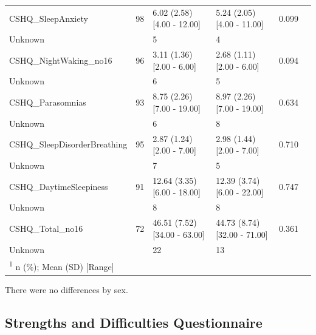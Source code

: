 \documentclass[
]{article}
\begin{document}
\begin{table}[!h]
\begin{tabular}[t]{llllll}
\addlinespace
CSHQ\_SleepAnxiety & 98 & 6.02 (2.58)   [4.00 - 12.00] & 5.24 (2.05)   [4.00 - 11.00] & 0.099 & \\
\hspace{1em}Unknown &  & 5 & 4 &  & \\
CSHQ\_NightWaking\_no16 & 96 & 3.11 (1.36)   [2.00 - 6.00] & 2.68 (1.11)   [2.00 - 6.00] & 0.094 & \\
\hspace{1em}Unknown &  & 6 & 5 &  & \\
CSHQ\_Parasomnias & 93 & 8.75 (2.26)   [7.00 - 19.00] & 8.97 (2.26)   [7.00 - 19.00] & 0.634 & \\
\addlinespace
\hspace{1em}Unknown &  & 6 & 8 &  & \\
CSHQ\_SleepDisorderBreathing & 95 & 2.87 (1.24)   [2.00 - 7.00] & 2.98 (1.44)   [2.00 - 7.00] & 0.710 & \\
\hspace{1em}Unknown &  & 7 & 5 &  & \\
CSHQ\_DaytimeSleepiness & 91 & 12.64 (3.35)   [6.00 - 18.00] & 12.39 (3.74)   [6.00 - 22.00] & 0.747 & \\
\hspace{1em}Unknown &  & 8 & 8 &  & \\
\addlinespace
CSHQ\_Total\_no16 & 72 & 46.51 (7.52)   [34.00 - 63.00] & 44.73 (8.74)   [32.00 - 71.00] & 0.361 & \\
\hspace{1em}Unknown &  & 22 & 13 &  & \\
\bottomrule
\multicolumn{6}{l}{\rule{0pt}{1em}\textsuperscript{1} n (\%); Mean (SD)   [Range]}\\
\end{tabular}
\end{table}

There were no differences by sex.

\FloatBarrier
\clearpage

\hypertarget{strengths-and-difficulties-questionnaire-1}{%
\subsection{Strengths and Difficulties
Questionnaire}\label{strengths-and-difficulties-questionnaire-1}}
\end{document}
